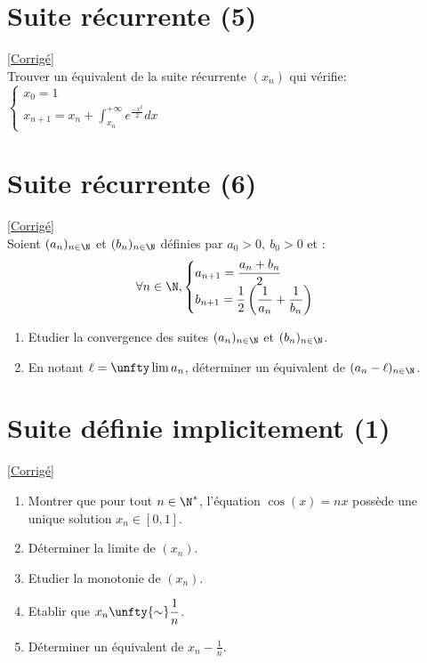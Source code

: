 \documentclass{book}
\begin{document}
	\section{Suite récurrente (5) }
	\textcolor{blue}{\hyperref[sec:suite-recurrente-5]{[Corrigé]}}\\
	\label{Suite récurrente 5}
	Trouver un équivalent de la suite récurrente $(x_n)$ qui vérifie: $\begin{cases}
		x_0=1\\
		x_{n+1}=x_n+\displaystyle \int_{x_n}^{+\infty}e^{\frac{-x^2}{2}}dx
	\end{cases}$
	
	\section{Suite récurrente (6) }
	\textcolor{blue}{\hyperref[sec:suite-recurrente-6]{[Corrigé]}}\\
	\label{Suite récurrente 6}
	Soient $(a_n)_{n\in \N}$ et $(b_n)_{n\in \N}$ définies par $a_0>0,\ b_0>0$ et :
	$$\forall n\in \N,\begin{cases} \displaystyle a_{n+1}=\frac{a_n+b_n}{2}  \\ \displaystyle b_{n+1}=\frac{1}{2}\left(\frac{1}{a_n}+\frac{1}{b_n}\right)\end{cases}$$
	\begin{enumerate}
		\item Etudier la convergence des suites $(a_n)_{n\in \N}$ et $(b_n)_{n\in \N}$.
		\item En notant $\ell=\unfty\lim a_n$, déterminer un équivalent de $(a_n-\ell)_{n\in \N}$.
	\end{enumerate}
	
	\section{Suite définie implicitement (1) }
	\textcolor{blue}{\hyperref[sec:suite-definie-implicitement-1etoile2]{[Corrigé]}}\\
	\label{Suite définie implicitment 1}
	\begin{enumerate}[leftmargin=*]
		\item Montrer que pour tout $n\in\N^*$, l'équation $\cos(x)=nx$ possède une unique solution $x_n\in[0,1]$.
		\item Déterminer la limite de $(x_n)$.
		\item Etudier la monotonie de $(x_n)$.
		\item Etablir que $x_n \unfty{\sim}\displaystyle\frac{1}{n}$.
		\item Déterminer un équivalent de $x_n-\displaystyle\frac{1}{n}$.
	\end{enumerate}
	
\end{document}
